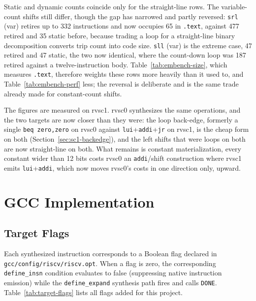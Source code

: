 Static and dynamic counts coincide only for the straight-line rows. The variable-count shifts still
differ, though the gap has narrowed and partly reversed: \texttt{srl} (var) retires up to 332
instructions and now occupies 65 in \texttt{.text}, against 477 retired and 35 static before, because
trading a loop for a straight-line binary decomposition converts trip count into code size.
\texttt{sll} (var) is the extreme case, 47 retired and 47 static, the two now identical, where the
count-down loop was 187 retired against a twelve-instruction body. Table~\ref{tab:embench-size}, which
measures \texttt{.text}, therefore weights these rows more heavily than it used to, and
Table~\ref{tab:embench-perf} less; the reversal is deliberate and is the same trade already made for
constant-count shifts.

The figures are measured on rvsc1. rvsc0 synthesizes the same operations, and the two targets are now
closer than they were: the loop back-edge, formerly a single \texttt{beq zero,zero} on rvsc0 against
\texttt{lui}+\texttt{addi}+\texttt{jr} on rvsc1, is the cheap form on both
(Section~\ref{sec:sc1-backedge}), and the left shifts that were loops on both are now straight-line on
both. What remains is constant materialization, every constant wider than 12 bits costs rvsc0 an
\texttt{addi}/shift construction where rvsc1 emits \texttt{lui}+\texttt{addi}, which now moves
rvsc0's costs in one direction only, upward.

\section{GCC Implementation} \label{sec:sc1-gcc-impl}

\subsection{Target Flags} \label{sec:sc1-flags}

Each synthesized instruction corresponds to a Boolean flag declared in
\nolinkurl{gcc/config/riscv/riscv.opt}. When a flag is zero, the corresponding \texttt{define\_insn}
condition evaluates to false (suppressing native instruction emission) while the
\texttt{define\_expand} synthesis path fires and calls \texttt{DONE}.
Table~\ref{tab:target-flags} lists all flags added for this project.

